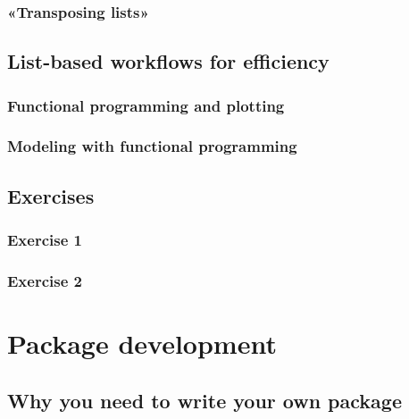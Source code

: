 \documentclass[]{gitbook}
\begin{document}
\hypertarget{transposing-lists}{%
\subsubsection{«Transposing lists»}\label{transposing-lists}}

\hypertarget{list-based-workflows-for-efficiency}{%
\subsection{List-based workflows for efficiency}\label{list-based-workflows-for-efficiency}}

\hypertarget{functional-programming-and-plotting}{%
\subsubsection{Functional programming and plotting}\label{functional-programming-and-plotting}}

\hypertarget{modeling-with-functional-programming}{%
\subsubsection{Modeling with functional programming}\label{modeling-with-functional-programming}}

\hypertarget{exercises-5}{%
\subsection{Exercises}\label{exercises-5}}

\hypertarget{exercise-1-5}{%
\subsubsection*{Exercise 1}\label{exercise-1-5}}

\hypertarget{exercise-2-3}{%
\subsubsection*{Exercise 2}\label{exercise-2-3}}

\hypertarget{package-development}{%
\section{Package development}\label{package-development}}

\hypertarget{why-you-need-to-write-your-own-package}{%
\subsection{Why you need to write your own package}\label{why-you-need-to-write-your-own-package}}
\end{document}

